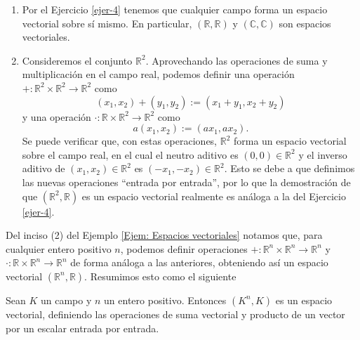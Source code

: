 \documentclass[notasLineal]{subfiles}
\begin{document}
\begin{Ejem}\label{Ejem: Espacios vectoriales}\leavevmode
    
    \begin{enumerate}[label=(\arabic*)]
    
        \item Por el Ejercicio \ref{ejer-4} tenemos que cualquier campo forma un espacio vectorial sobre sí mismo. En particular, $(\mathbb{R},\mathbb{R})$ y $(\mathbb{C},\mathbb{C})$ son espacios vectoriales. \\ %

        \item Consideremos el conjunto $\mathbb{R}^2$. Aprovechando las operaciones de suma y multiplicación en el campo real, podemos definir una operación $+:\mathbb{R}^2\times\mathbb{R}^2\to \mathbb{R}^2$ como
            \[
                (x_1, x_2) + (y_1,y_2) := (x_1+y_1,x_2+y_2)
            \] 
            y una operación $\cdot:\mathbb{R}\times \mathbb{R}^2\to \mathbb{R}^2$ como
            \[
                a(x_1,x_2) := (ax_1,ax_2).
            \] 
            Se puede verificar que, con estas operaciones, $\mathbb{R}^2$ forma un espacio vectorial sobre el campo real, en el cual el neutro aditivo es $(0,0)\in\mathbb{R}^2$ y el inverso aditivo de $(x_1,x_2)\in\mathbb{R}^2$ es $(-x_1,-x_2)\in\mathbb{R}^2$. Esto se debe a que definimos las nuevas operaciones ``entrada por entrada'', por lo que la demostración de que $(\mathbb{R}^2,\mathbb{R})$ es un espacio vectorial realmente es análoga a la del Ejercicio \ref{ejer-4}. 
    \end{enumerate}
\end{Ejem}

Del inciso (2) del Ejemplo \ref{Ejem: Espacios vectoriales} notamos que, para cualquier entero positivo $n$, podemos definir operaciones $+:\mathbb{R}^n\times \mathbb{R}^n\to \mathbb{R}^n$ y $\cdot:\mathbb{R}\times \mathbb{R}^n\to \mathbb{R}^n$ de forma análoga a las anteriores, obteniendo así un espacio vectorial $(\mathbb{R}^n,\mathbb{R})$. Resumimos esto como el siguiente

\begin{Coro}\label{coro:1.7}
    Sean $K$ un campo y $n$ un entero positivo. Entonces $(K^n,K)$ es un espacio vectorial, definiendo las operaciones de suma vectorial y producto de un vector por un escalar entrada por entrada.
\end{Coro}
\end{document}
